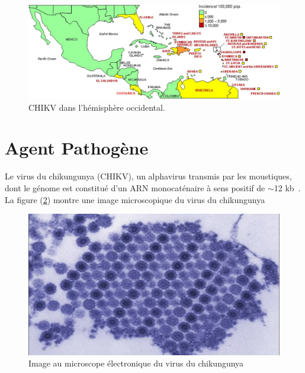\begin{figure}[!h]
	\begin{center}
		\includegraphics[width=14cm]{images/zjv9990995820001}
	\end{center}
	\caption{CHIKV dans l'hémisphère occidental\cite{Peyrefitte2007}.}
	\label{fig:chikvwestern}
\end{figure}

\section{Agent Pathogène}
Le virus du chikungunya (CHIKV), un alphavirus transmis par les moustiques, dont le génome est constitué d'un ARN monocaténaire à sens positif de $\sim$12 kb~\cite{JournalofVirology}. La figure (\ref{fig:chikv}) montre une image microscopique du virus du chikungunya
\begin{figure}[!h]
	\begin{center}
		\includegraphics[width=12cm]{images/CHIK_17550_TEM}
	\end{center}
	\caption{Image au microscope électronique du virus du chikungunya~\cite{chikvcdc}}
	\label{fig:chikv} 
\end{figure}

